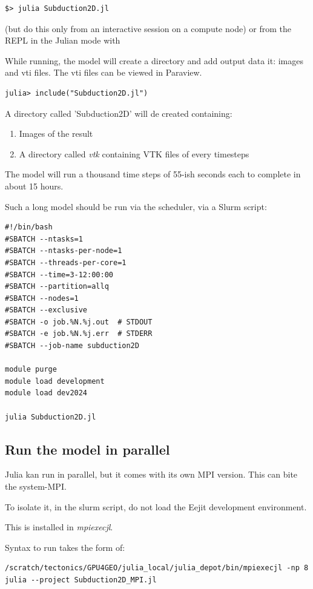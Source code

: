 \documentclass{article}
\begin{document}
\begin{verbatim}
$> julia Subduction2D.jl
\end{verbatim}
(but do this only from an interactive session on a compute node)
or from the REPL in the Julian mode with

While running, the model will create a directory and add output data it: images and vti files. 
The vti files can be viewed in Paraview.

\begin{verbatim}
julia> include("Subduction2D.jl")
\end{verbatim}

A directory called 'Subduction2D' will de created containing:
\begin{enumerate}
\item Images of the result
\item A directory called \textit{vtk} containing VTK files of every timesteps
\end{enumerate}

The model will run a thousand time steps of 55-ish seconds each to complete in about 15 hours.

Such a long model should be run via the scheduler, via a Slurm script:

\begin{verbatim}
#!/bin/bash
#SBATCH --ntasks=1
#SBATCH --ntasks-per-node=1
#SBATCH --threads-per-core=1
#SBATCH --time=3-12:00:00
#SBATCH --partition=allq
#SBATCH --nodes=1
#SBATCH --exclusive
#SBATCH -o job.%N.%j.out  # STDOUT
#SBATCH -e job.%N.%j.err  # STDERR
#SBATCH --job-name subduction2D

module purge
module load development
module load dev2024

julia Subduction2D.jl
\end{verbatim}


\subsection{Run the model in parallel}

Julia kan run in parallel, but it comes with its own MPI version.
This can bite the system-MPI.

To isolate it, in the slurm script, do not load the Eejit development environment.

This is installed in \textit{mpiexecjl}.

Syntax to run takes the form of:

\begin{verbatim}
/scratch/tectonics/GPU4GEO/julia_local/julia_depot/bin/mpiexecjl -np 8 julia --project Subduction2D_MPI.jl
\end{verbatim}
\end{document}
